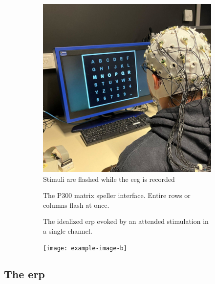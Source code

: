 \begin{figure}[t]
  \begin{subfigure}[t]{.45\textwidth}
  \includegraphics[width=\textwidth, height=\textwidth]{figures/bci/illustration}
    \caption{Stimuli are flashed while the \ac{eeg} is recorded}
  \end{subfigure}\hfill%
  \begin{subfigure}[t]{.45\textwidth}
    
    \caption{The P300 matrix speller interface. Entire rows or columns flash at once.}
  \end{subfigure}

  \begin{subfigure}[t]{.45\textwidth}
    
    \caption{The idealized \ac{erp} evoked by an attended stimulation in a single
    channel.}
  \end{subfigure}\hfill%
  \begin{subfigure}[t]{.45\textwidth}
    \texttt{[image: example-image-b]}
  \end{subfigure}
\end{figure}

\subsection{The \acl{erp}}
\label{sec:bci/oddball/erp}

